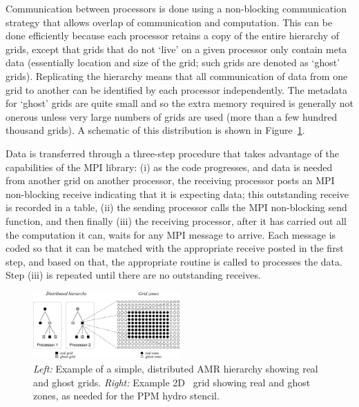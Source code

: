 Communication between processors is done using a non-blocking
communication strategy that allows overlap of communication and
computation.  This can be done efficiently because each processor
retains a copy of the entire hierarchy of grids, except that grids
that do not `live' on a given processor only contain meta data
(essentially location and size of the grid; such grids are denoted as
`ghost' grids).  Replicating the hierarchy means that all
communication of data from one grid to another can be identified by
each processor independently.  The metadata for `ghost' grids are
quite small and so the extra memory required is generally not onerous
unless very large numbers of grids are used (more than a few hundred
thousand grids).  A schematic of this distribution is shown in
Figure~\ref{fig.amr_hierarchy}.

Data is transferred through a three-step procedure that takes
advantage of the capabilities of the MPI library: (i) as the code
progresses, and data is needed from another grid on another processor,
the receiving processor posts an MPI non-blocking receive indicating
that it is expecting data; this outstanding receive is recorded in a
table, (ii) the sending processor calls the MPI non-blocking send
function, and then finally (iii) the receiving processor, after it has
carried out all the computation it can, waits for any MPI message to
arrive.  Each message is coded so that it can be matched with the
appropriate receive posted in the first step, and based on that, the
appropriate routine is called to processes the data.  Step (iii) is
repeated until there are no outstanding receives.

 

\begin{figure}
\begin{center}
\includegraphics[width=0.5\textwidth]{figures/amr_hierarchy.eps}
\end{center}
\caption{\emph{Left:} Example of a simple, distributed AMR hierarchy
showing real and ghost grids.  \emph{Right:} Example 2D \enzo\ grid
showing real and ghost zones, as needed for the PPM hydro stencil. }
\label{fig.amr_hierarchy}
\end{figure}



